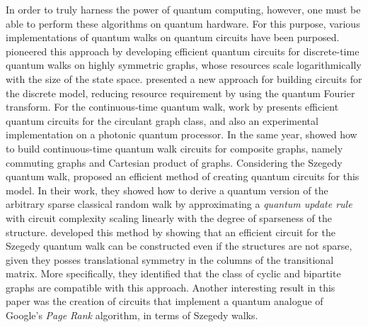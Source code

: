 \documentclass[../../dissertation.tex]{subfiles}
\begin{document}
In order to truly harness the power of quantum computing, however, one must be
able to perform these algorithms on quantum hardware. For this purpose, various
implementations of quantum walks on quantum circuits have been purposed.
\cite{douglaswang07} pioneered this approach by developing
efficient quantum circuits for discrete-time quantum walks on highly symmetric
graphs, whose resources scale logarithmically with the size of the state space.
\cite{shakeel2020} presented a new approach for building circuits for the
discrete model, reducing resource requirement by using the quantum Fourier
transform. 
For the continuous-time quantum walk, work by \cite{qiang2016} presents
efficient quantum circuits for the circulant graph class, and also an
experimental implementation on a photonic quantum processor. In the same year,
\cite{loke2017b} showed how to build continuous-time quantum walk circuits for
composite graphs, namely commuting graphs and Cartesian product of graphs.
Considering the Szegedy quantum walk, \cite{chiang2009} proposed an efficient
method of creating quantum circuits for this model.  In their work, they showed
how to derive a quantum version of the arbitrary sparse classical random walk
by approximating a \textit{quantum update rule} with circuit complexity scaling
linearly with the degree of sparseness of the structure. \cite{loke2017a}
developed this method by showing that an efficient circuit for the Szegedy
quantum walk can be constructed even if the structures are not sparse, given
they posses translational symmetry in the columns of the transitional matrix.
More specifically, they identified that the class of cyclic and bipartite
graphs are compatible with this approach.  Another interesting result in this
paper was the creation of circuits that implement a quantum analogue of
Google's \textit{Page Rank} algorithm, in terms of Szegedy walks. \par
\end{document}
